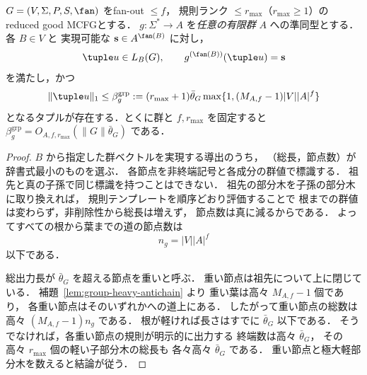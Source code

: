 \begin{theorem}[任意の有限群値を指定した短いタプル]
\label{thm:group-typed-shortest}
$G=(V,\Sigma,P,S,\fan)$ をfan-out $\le f$，
規則ランク $\le r_{\max}$（$r_{\max}\ge1$）の
reduced good MCFGとする．
$g:\Sigma^*\to A$ を\emph{任意の有限群}
$A$ への準同型とする．各 $B\in V$ と
実現可能な $\mathbf s\in A^{\fan(B)}$ に対し，
\[
 \tuple u\in L_B(G),\qquad
 g^{(\fan(B))}(\tuple u)=\mathbf s
\]
を満たし，かつ
\[
 \|\tuple u\|_1\le
 \beta_g^{\mathrm{grp}}:=
 (r_{\max}+1)\bar\theta_G
 \max\{1,(M_{A,f}-1)|V||A|^f\}
\]
となるタプルが存在する．とくに群と
$f,r_{\max}$ を固定すると
$\beta_g^{\mathrm{grp}}
=O_{A,f,r_{\max}}(\|G\|\bar\theta_G)$ である．
\end{theorem}
\begin{proof}
$B$ から指定した群ベクトルを実現する導出のうち，
（総長，節点数）が辞書式最小のものを選ぶ．
各節点を非終端記号と各成分の群値で標識する．
祖先と真の子孫で同じ標識を持つことはできない．
祖先の部分木を子孫の部分木に取り換えれば，
規則テンプレートを順序どおり評価することで
根までの群値は変わらず，非削除性から総長は増えず，
節点数は真に減るからである．
よってすべての根から葉までの道の節点数は
\[
 n_g=|V||A|^f
\]
以下である．

総出力長が $\bar\theta_G$ を超える節点を重いと呼ぶ．
重い節点は祖先について上に閉じている．
補題~\ref{lem:group-heavy-antichain} より
重い葉は高々 $M_{A,f}-1$ 個であり，
各重い節点はそのいずれかへの道上にある．
したがって重い節点の総数は高々
$(M_{A,f}-1)n_g$ である．
根が軽ければ長さはすでに $\bar\theta_G$ 以下である．
そうでなければ，各重い節点の規則が明示的に出力する
終端数は高々 $\bar\theta_G$，
その高々 $r_{\max}$ 個の軽い子部分木の総長も
各々高々 $\bar\theta_G$ である．
重い節点と極大軽部分木を数えると結論が従う．
\end{proof}

